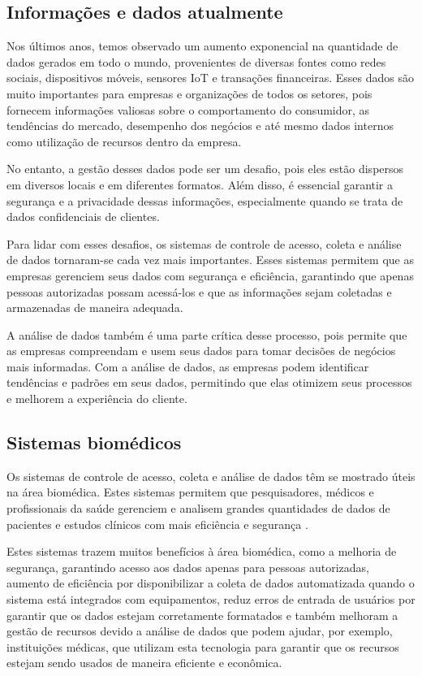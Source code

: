 \subsection{Informações e dados atualmente}


Nos últimos anos, temos observado um aumento exponencial na quantidade de dados gerados em todo o mundo, provenientes de diversas fontes como redes sociais, dispositivos móveis, sensores IoT e transações financeiras.
Esses dados são muito importantes para empresas e organizações de todos os setores, pois fornecem informações valiosas sobre o comportamento do consumidor, as tendências do mercado, desempenho dos negócios e até mesmo dados internos como utilização de recursos dentro da empresa.

No entanto, a gestão desses dados pode ser um desafio, pois eles estão dispersos em diversos locais e em diferentes formatos. Além disso, é essencial garantir a segurança e a privacidade dessas informações, especialmente quando se trata de dados confidenciais de clientes.

Para lidar com esses desafios, os sistemas de controle de acesso, coleta e análise de dados tornaram-se cada vez mais importantes. Esses sistemas permitem que as empresas gerenciem seus dados com segurança e eficiência, garantindo que apenas pessoas autorizadas possam acessá-los e que as informações sejam coletadas e armazenadas de maneira adequada.

A análise de dados também é uma parte crítica desse processo, pois permite que as empresas compreendam e usem seus dados para tomar decisões de negócios mais informadas. Com a análise de dados, as empresas podem identificar tendências e padrões em seus dados, permitindo que elas otimizem seus processos e melhorem a experiência do cliente.

\subsection{Sistemas biomédicos}

Os sistemas de controle de acesso, coleta e análise de dados têm se mostrado úteis na área biomédica. Estes sistemas permitem que pesquisadores, médicos e profissionais da saúde gerenciem e analisem grandes quantidades de dados de pacientes e estudos clínicos com mais eficiência e segurança \cite{Sun2021LaboratoryEfficiency}.

Estes sistemas trazem muitos benefícios à área biomédica, como a melhoria de segurança, garantindo acesso aos dados apenas para pessoas autorizadas, aumento de eficiência por disponibilizar a coleta de dados automatizada quando o sistema está integrados com equipamentos, reduz erros de entrada de usuários por garantir que os dados estejam corretamente formatados e também melhoram a gestão de recursos devido a análise de dados que podem ajudar, por exemplo, instituições médicas, que utilizam esta tecnologia para garantir que os recursos estejam sendo usados de maneira eficiente e econômica.

